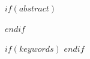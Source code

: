 $if(abstract)$
\begin{abstract}
$abstract$
\end{abstract}
$endif$

$if(keywords)$
$endif$

\maketitle